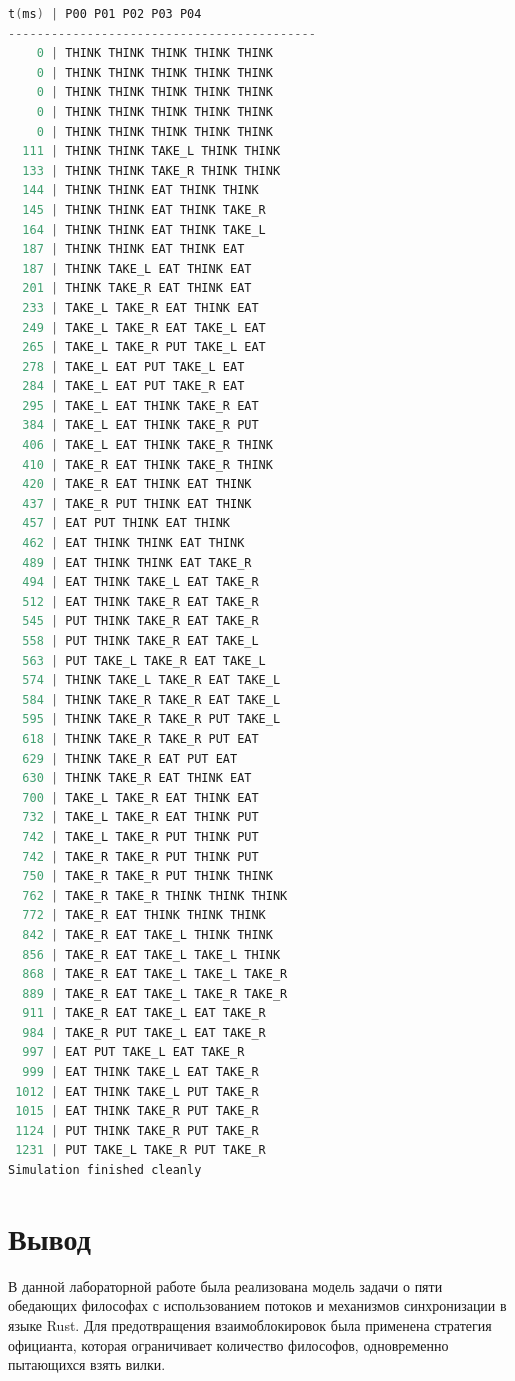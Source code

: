 \documentclass[a4paper, 14pt]{extarticle}
\begin{document}
\begin{lstlisting}[caption={Вывод программы}, label={lst:program_output}, language=C++]
t(ms) | P00 P01 P02 P03 P04 
-------------------------------------------
    0 | THINK THINK THINK THINK THINK 
    0 | THINK THINK THINK THINK THINK 
    0 | THINK THINK THINK THINK THINK 
    0 | THINK THINK THINK THINK THINK 
    0 | THINK THINK THINK THINK THINK 
  111 | THINK THINK TAKE_L THINK THINK 
  133 | THINK THINK TAKE_R THINK THINK 
  144 | THINK THINK EAT THINK THINK 
  145 | THINK THINK EAT THINK TAKE_R 
  164 | THINK THINK EAT THINK TAKE_L 
  187 | THINK THINK EAT THINK EAT 
  187 | THINK TAKE_L EAT THINK EAT 
  201 | THINK TAKE_R EAT THINK EAT 
  233 | TAKE_L TAKE_R EAT THINK EAT 
  249 | TAKE_L TAKE_R EAT TAKE_L EAT 
  265 | TAKE_L TAKE_R PUT TAKE_L EAT 
  278 | TAKE_L EAT PUT TAKE_L EAT 
  284 | TAKE_L EAT PUT TAKE_R EAT 
  295 | TAKE_L EAT THINK TAKE_R EAT 
  384 | TAKE_L EAT THINK TAKE_R PUT 
  406 | TAKE_L EAT THINK TAKE_R THINK 
  410 | TAKE_R EAT THINK TAKE_R THINK 
  420 | TAKE_R EAT THINK EAT THINK 
  437 | TAKE_R PUT THINK EAT THINK 
  457 | EAT PUT THINK EAT THINK 
  462 | EAT THINK THINK EAT THINK 
  489 | EAT THINK THINK EAT TAKE_R 
  494 | EAT THINK TAKE_L EAT TAKE_R 
  512 | EAT THINK TAKE_R EAT TAKE_R 
  545 | PUT THINK TAKE_R EAT TAKE_R 
  558 | PUT THINK TAKE_R EAT TAKE_L 
  563 | PUT TAKE_L TAKE_R EAT TAKE_L 
  574 | THINK TAKE_L TAKE_R EAT TAKE_L 
  584 | THINK TAKE_R TAKE_R EAT TAKE_L 
  595 | THINK TAKE_R TAKE_R PUT TAKE_L 
  618 | THINK TAKE_R TAKE_R PUT EAT 
  629 | THINK TAKE_R EAT PUT EAT 
  630 | THINK TAKE_R EAT THINK EAT 
  700 | TAKE_L TAKE_R EAT THINK EAT 
  732 | TAKE_L TAKE_R EAT THINK PUT 
  742 | TAKE_L TAKE_R PUT THINK PUT 
  742 | TAKE_R TAKE_R PUT THINK PUT 
  750 | TAKE_R TAKE_R PUT THINK THINK 
  762 | TAKE_R TAKE_R THINK THINK THINK 
  772 | TAKE_R EAT THINK THINK THINK 
  842 | TAKE_R EAT TAKE_L THINK THINK 
  856 | TAKE_R EAT TAKE_L TAKE_L THINK 
  868 | TAKE_R EAT TAKE_L TAKE_L TAKE_R 
  889 | TAKE_R EAT TAKE_L TAKE_R TAKE_R 
  911 | TAKE_R EAT TAKE_L EAT TAKE_R 
  984 | TAKE_R PUT TAKE_L EAT TAKE_R 
  997 | EAT PUT TAKE_L EAT TAKE_R 
  999 | EAT THINK TAKE_L EAT TAKE_R 
 1012 | EAT THINK TAKE_L PUT TAKE_R 
 1015 | EAT THINK TAKE_R PUT TAKE_R 
 1124 | PUT THINK TAKE_R PUT TAKE_R 
 1231 | PUT TAKE_L TAKE_R PUT TAKE_R 
Simulation finished cleanly
\end{lstlisting}

\section*{Вывод}\label{Sect::conclusion}
В данной лабораторной работе была реализована модель задачи о пяти обедающих философах с использованием потоков и механизмов синхронизации в языке Rust. Для предотвращения взаимоблокировок была применена стратегия официанта, которая ограничивает количество философов, одновременно пытающихся взять вилки.
\end{document}
